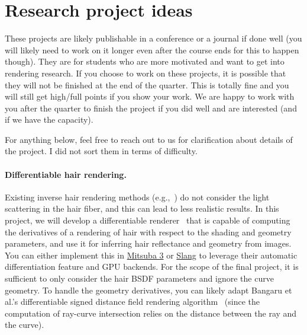 \section{Research project ideas}
These projects are likely publishable in a conference or a journal if done well (you will likely need to work on it longer even after the course ends for this to happen though).
They are for students who are more motivated and want to get into rendering research.
If you choose to work on these projects, it is possible that they will not be finished at the end of the quarter. This is totally fine and you will still get high/full points if you show your work.
We are happy to work with you after the quarter to finish the project if you did well and are interested (and if we have the capacity).

For anything below, feel free to reach out to us for clarification about details of the project.
I did not sort them in terms of difficulty.

\paragraph{Differentiable hair rendering.}
Existing inverse hair rendering methods (e.g.,~\cite{Rosu:2022:NSL}) do not consider the light scattering in the hair fiber, and this can lead to less realistic results.
In this project, we will develop a differentiable renderer~\cite{Li:2018:DMC} that is capable of computing the derivatives of a rendering of hair with respect to the shading and geometry parameters, and use it for inferring hair reflectance and geometry from images.
You can either implement this in \href{https://github.com/mitsuba-renderer/mitsuba3}{Mitsuba 3} or \href{https://developer.nvidia.com/blog/differentiable-slang-example-applications/}{Slang} to leverage their automatic differentiation feature and GPU backends.
For the scope of the final project, it is sufficient to only consider the hair BSDF parameters and ignore the curve geometry.
To handle the geometry derivatives, you can likely adapt Bangaru et al.'s differentiable signed distance field rendering algorithm~\cite{Bangaru:2022:DRN} (since the computation of ray-curve intersection relies on the distance between the ray and the curve).

